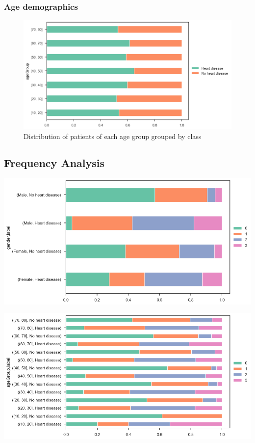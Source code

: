 \subsubsection{Age demographics}

\begin{figure}
    \caption{Distribution of patients of each age group grouped by class}\label{demographics-agegroup-target-percent}
    \centering
    \includegraphics[width=\linewidth]{media/demographics-05-agegroup-target-percentage.png}
\end{figure}



\subsection{Frequency Analysis}

\includegraphics[width=0.8\linewidth]{media/frequency-01-gender-vessels.png}

\includegraphics[width=0.8\linewidth]{media/frequency-02-agegroup-vessels.png}

